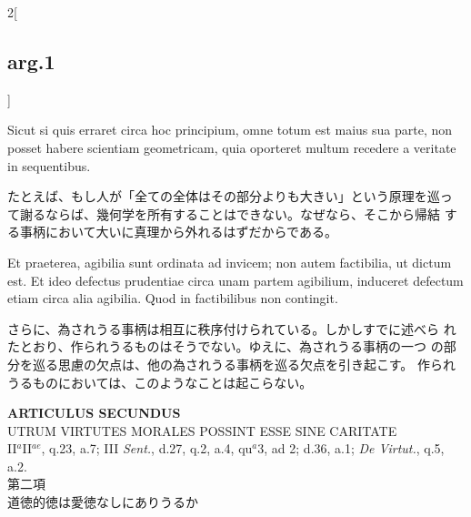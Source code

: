 \documentclass[paper=a4paper,fontsize=10pt,jafontsize=9pt,titlepage]{jlreq}
\begin{document}
\begin{paracol}{2}[\subsection{arg.1}]
\switchcolumn*

Sicut si quis erraret circa hoc principium, omne totum est maius sua
parte, non posset habere scientiam geometricam, quia oporteret multum
recedere a veritate in sequentibus.

\switchcolumn

たとえば、もし人が「全ての全体はその部分よりも大きい」という原理を巡っ
 て謝るならば、幾何学を所有することはできない。なぜなら、そこから帰結
 する事柄において大いに真理から外れるはずだからである。

\switchcolumn*

Et praeterea, agibilia sunt ordinata ad invicem; non autem
factibilia, ut dictum est. Et ideo defectus prudentiae circa unam
partem agibilium, induceret defectum etiam circa alia agibilia. Quod
in factibilibus non contingit.

\switchcolumn

さらに、為されうる事柄は相互に秩序付けられている。しかしすでに述べら
 れたとおり、作られうるものはそうでない。ゆえに、為されうる事柄の一つ
 の部分を巡る思慮の欠点は、他の為されうる事柄を巡る欠点を引き起こす。
 作られうるものにおいては、このようなことは起こらない。

\end{paracol}
\newpage
{}
{}
\setcounter{section}{2}
\setcounter{subsection}{0}




\begin{center}
{\Large {\bfseries ARTICULUS SECUNDUS}}\\
{\large UTRUM VIRTUTES MORALES POSSINT ESSE SINE CARITATE}\\
{\footnotesize II$^{a}$II$^{ae}$, q.23, a.7; III {\itshape Sent.}, d.27, q.2, a.4, qu$^{a}$3, ad 2; d.36, a.1; {\itshape De Virtut.}, q.5, a.2.}\\
{\Large 第二項\\道徳的徳は愛徳なしにありうるか}
\end{center}
\end{document}
